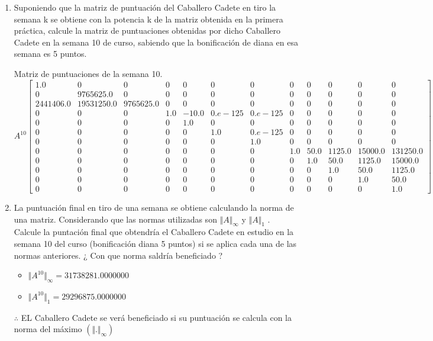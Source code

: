 \documentclass[10pt,a4paper]{article}
\begin{document}
\begin{enumerate}
	\item Suponiendo que la matriz de puntuación del Caballero Cadete en tiro la semana k se obtiene con la potencia k de la matriz obtenida en la primera práctica, calcule la matriz de puntuaciones obtenidas por dicho Caballero Cadete en la semana 10 de curso, sabiendo que la bonificación de diana en esa semana es 5 puntos.
	
	Matriz de puntuaciones de la semana  10.
	$$
	A^{10}\begin{bmatrix}
1.0	&	0	&	0	&	0	&	0	&	0	&	0	&	0	&	0	&	0	&	0	&	0\\
0	&	9765625.0	&	0	&	0	&	0	&	0	&	0	&	0	&	0	&	0	&	0	&	0\\
2441406.0	&	19531250.0	&	9765625.0	&	0	&	0	&	0	&	0	&	0	&	0	&	0	&	0	&	0\\
0	&	0	&	0	&	1.0	&	-10.0	&	0.e-125	&	 0.e-125	&	0	&	0	&	0	&	0	&	0\\
0	&	0	&	0	&	0	&	1.0	&	0	&	0	&	0	&	0	&	0	&	0	&	0\\
0	&	0	&	0	&	0	&	0	&	1.0	&	0.e-125	&	0	&	0	&	0	&	0	&	0\\
0	&	0	&	0	&	0	&	0	&	0	&	1.0	&	0	&	0	&	0	&	0	&	0\\
0	&	0	&	0	&	0	&	0	&	0	&	0	&	1.0	&	50.0	&	1125.0	&	15000.0	&	131250.0\\
0	&	0	&	0	&	0	&	0	&	0	&	0	&	0	&	1.0	&	50.0	&	1125.0	&	15000.0\\
0	&	0	&	0	&	0	&	0	&	0	&	0	&	0	&	0	&	1.0	&	50.0	&	1125.0\\
0	&	0	&	0	&	0	&	0	&	0	&	0	&	0	&	0	&	0	&	1.0	&	50.0\\
0	&	0	&	0	&	0	&	0	&	0	&	0	&	0	&	0	&	0	&	0	&	1.0
\end{bmatrix}	
	$$    
	
	
	\item La puntuación final en tiro de una semana se obtiene calculando la norma de una matriz. Considerando que las normas utilizadas son $\Vert A\Vert_{\infty}$ y $\Vert A\Vert_{1}$ . Calcule la puntación final que obtendría el Caballero Cadete en estudio en la semana 10 del curso (bonificación diana 5 puntos) si se aplica cada una de las normas anteriores. ¿ Con que norma saldría beneficiado ?
		\begin{itemize}
			\item $\Vert A^{10}\Vert_{\infty} = 31738281.0000000$
			\item $\Vert A^{10}\Vert_{1} = 29296875.0000000$
		\end{itemize}
		$\therefore$ EL Caballero Cadete se verá beneficiado si su puntuación se calcula con la norma del máximo $(\Vert .\Vert_{\infty})$
\end{enumerate}









    
\end{document}
